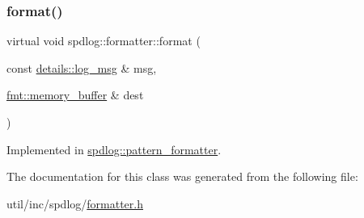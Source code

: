 \subsubsection{\texorpdfstring{format()}{format()}}
{\footnotesize\ttfamily virtual void spdlog\+::formatter\+::format (\begin{DoxyParamCaption}\item[{const \hyperlink{structspdlog_1_1details_1_1log__msg}{details\+::log\+\_\+msg} \&}]{msg,  }\item[{\hyperlink{format_8h_a21cbf729f69302f578e6db21c5e9e0d2}{fmt\+::memory\+\_\+buffer} \&}]{dest }\end{DoxyParamCaption})\hspace{0.3cm}{\ttfamily [pure virtual]}}



Implemented in \hyperlink{classspdlog_1_1pattern__formatter_ae43e84d7421ee7810b22ce1dc817ca3f}{spdlog\+::pattern\+\_\+formatter}.



The documentation for this class was generated from the following file\+:\begin{DoxyCompactItemize}
\item 
util/inc/spdlog/\hyperlink{formatter_8h}{formatter.\+h}\end{DoxyCompactItemize}
